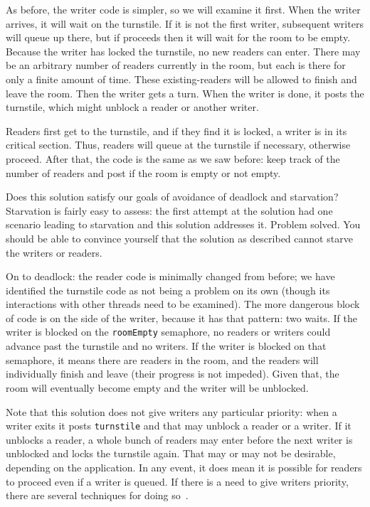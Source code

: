 As before, the writer code is simpler, so we will examine it first. When the writer arrives, it will wait on the turnstile. If it is not the first writer, subsequent writers will queue up there, but if proceeds then it will wait for the room to be empty. Because the writer has locked the turnstile, no new readers can enter. There may be an arbitrary number of readers currently in the room, but each is there for only a finite amount of time. These existing-readers will be allowed to finish and leave the room. Then the writer gets a turn. When the writer is done, it posts the turnstile, which might unblock a reader or another writer.

Readers first get to the turnstile, and if they find it is locked, a writer is in its critical section. Thus, readers will queue at the turnstile if necessary, otherwise proceed. After that, the code is the same as we saw before: keep track of the number of readers and post if the room is empty or not empty.

Does this solution satisfy our goals of avoidance of deadlock and starvation? Starvation is fairly easy to assess: the first attempt at the solution had one scenario leading to starvation and this solution addresses it. Problem solved. You should be able to convince yourself that the solution as described cannot starve the writers or readers.

On to deadlock: the reader code is minimally changed from before; we have identified the turnstile code as not being a problem on its own (though its interactions with other threads need to be examined). The more dangerous block of code is on the side of the writer, because it has that pattern: two waits. If the writer is blocked on the \texttt{roomEmpty} semaphore, no readers or writers could advance past the turnstile and no writers. If the writer is blocked on that semaphore, it means there are readers in the room, and the readers will individually finish and leave (their progress is not impeded). Given that, the room will eventually become empty and the writer will be unblocked.


Note that this solution does not give writers any particular priority: when a writer exits it posts \texttt{turnstile} and that may unblock a reader or a writer. If it unblocks a reader, a whole bunch of readers may enter before the next writer is unblocked and locks the turnstile again. That may or may not be desirable, depending on the application. In any event, it does mean it is possible for readers to proceed even if a writer is queued. If there is a need to give writers priority, there are several techniques for doing so~\cite{lbs}.


